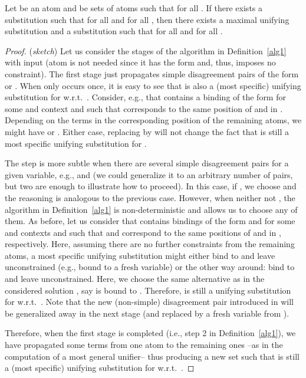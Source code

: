 \documentclass[fleqn]{tlp}
\begin{document}
\begin{appendix}
\begin{lemma}
  Let  be an atom and  be sets of atoms such that
   for all . If there exists a
  substitution  such that  for all
   and  for all , then
  there exists a maximal unifying substitution  and a
  substitution  such that  for all
   and  for all .
\end{lemma}

\begin{proof} (\emph{sketch})
  Let us consider the stages of the algorithm in Definition~\ref{alg1}
  with input  (atom  is not needed since it has the form
   and, thus, imposes no constraint).  The first
  stage just propagates simple disagreement pairs of the form  or
  . When  only occurs once, it is easy to see that  is
  also a (most specific) unifying substitution for  w.r.t.\
  . Consider, e.g., that  contains a binding of
  the form  for some  and context
   and such that  corresponds to the same position of 
  and  in . Depending on the terms in the corresponding
  position of the remaining atoms, we might have  or . Either case, replacing  by  will not change the fact that
   is still a most specific unifying substitution for
  .

  The step is more subtle when there are several simple disagreement
  pairs for a given variable, e.g.,  and  (we could
  generalize it to an arbitrary number of pairs, but two are enough to
  illustrate how to proceed). In this case, if , we
  choose  and the reasoning is analogous to the previous case.
  However, when neither  not , the algorithm
  in Definition~\ref{alg1} is non-deterministic and allows us to
  choose any of them. As before, let us consider that 
  contains bindings of the form  and  for
  some  and contexts  and such that
   and  correspond to the same positions of  and
   in , respectively. Here, assuming there are no further
  constraints from the remaining atoms, a most specific unifying
  substitution might either bind  to  and leave 
  unconstrained (e.g., bound to a fresh variable) or the other way
  around: bind  to  and leave  unconstrained. Here,
  we choose the same alternative as in the considered solution
  , say  is bound to . Therefore,  is
  still a unifying substitution for  w.r.t.\ . Note
  that the new (non-simple) disagreement pair  introduced in
   will be generalized away in the next stage (and
  replaced by a fresh variable from ).
  
  Therefore, when the first stage is completed (i.e., step 2 in
  Definition~\ref{alg1}), we have propagated some terms from one atom to
  the remaining ones --as in the computation of a most general
  unifier-- thus producing a new set  such that  is
  still a (most specific) unifying substitution for  w.r.t.\
  .


\end{proof}
\end{appendix}
\end{document}
